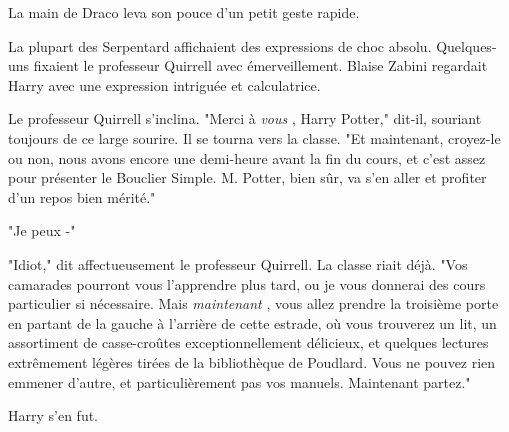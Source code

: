 La main de Draco leva son pouce d'un petit geste rapide.

La plupart des Serpentard affichaient des expressions de choc absolu. Quelques-uns fixaient le professeur Quirrell avec émerveillement. Blaise Zabini regardait Harry avec une expression intriguée et calculatrice.

Le professeur Quirrell s'inclina. "Merci à \emph{vous} , Harry Potter," dit-il, souriant toujours de ce large sourire. Il se tourna vers la classe. "Et maintenant, croyez-le ou non, nous avons encore une demi-heure avant la fin du cours, et c'est assez pour présenter le Bouclier Simple. M. Potter, bien sûr, va s'en aller et profiter d'un repos bien mérité."

"Je peux -"

"Idiot," dit affectueusement le professeur Quirrell. La classe riait déjà. "Vos camarades pourront vous l'apprendre plus tard, ou je vous donnerai des cours particulier si nécessaire. Mais \emph{maintenant} , vous allez prendre la troisième porte en partant de la gauche à l'arrière de cette estrade, où vous trouverez un lit, un assortiment de casse-croûtes exceptionnellement délicieux, et quelques lectures extrêmement légères tirées de la bibliothèque de Poudlard. Vous ne pouvez rien emmener d'autre, et particulièrement pas vos manuels. Maintenant partez."

Harry s'en fut.

